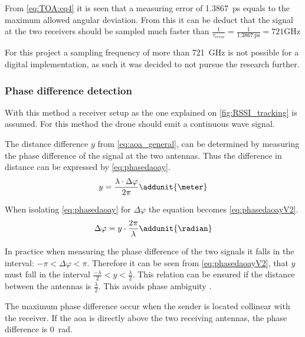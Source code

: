 From \autoref{eq:TOA:eq4} it is seen that a measuring error of \SI{1,3867}{\pico\second} equals to the maximum allowed angular deviation. From this it can be deduct that the signal at the two receivers should be sampled much faster than $\frac{1}{\tau_{error}} = \frac{1}{\SI{1.3867}{\pico\second} } = 721 \si{\giga\hertz}$

For this project a sampling frequency of more than \SI{721}{\giga\hertz} is not possible for a digital implementation, as such it was decided to not pursue the research further.

\subsubsection{Phase difference detection} \label{PhaseDifferenceDetection}
With this method a receiver setup as the one explained on \autoref{fig:RSSI_tracking} is assumed. For this method the drone should emit a continuous wave signal. 

The distance difference $y$ from \autoref{eq:aoa_general}, can be determined by measuring the phase difference of the signal at the two antennas. Thus the difference in distance can be expressed by \autoref{eq:phasedaoay}. 
\begin{equation} \label{eq:phasedaoay}
y=\frac{\lambda\cdot\Delta\varphi}{2\pi} \addunit{\meter}
\end{equation}
\startexplain
{}
\stopexplain

When isolating \autoref{eq:phasedaoay} for $\Delta\varphi$ the equation becomes \autoref{eq:phasedaoayV2}. 
\begin{equation} \label{eq:phasedaoayV2}
\Delta\varphi=y \cdot \frac{2\pi}{\lambda} \addunit{\radian}
\end{equation}

In practice when measuring the phase difference of the two signals it falls in the interval: $-\pi<\Delta\varphi<\pi$. Therefore it can be seen from \autoref{eq:phasedaoayV2}, that $y$ must fall in the interval $\frac{-\lambda}{2} < y < \frac{\lambda}{2}$. This relation can be ensured if the distance between the antennas is $\frac{\lambda}{2}$. This avoids phase ambiguity \citep{TechReport:DirectionFindingPaper,TechReport:Amundson2010}. 

The maximum phase difference occur when the sender is located collinear with the receiver. If the \gls{aoa} is directly above the two receiving antennas, the phase difference is \SI{0}{\radian}.

